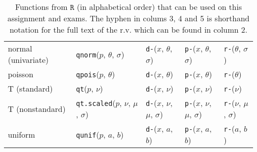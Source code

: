 \begin{table}[htp]
\begin{tabular}{l | llll}
    normal (univariate) & \texttt{qnorm}($p$, $\theta$, $\sigma$) 
    & \texttt{d-}($x$, $\theta$, $\sigma$)
    & \texttt{p-}($x$, $\theta$, $\sigma$) 
    & \texttt{r-}($\theta$, $\sigma$) \\
    
    
    poisson & \texttt{qpois}($p$, $\theta$) 
    & \texttt{d-}($x$, $\theta$)
    & \texttt{p-}($x$, $\theta$) 
    & \texttt{r-}($\theta$) \\
    
    T (standard) & \texttt{qt}($p$, $\nu$) 
    & \texttt{d-}($x$, $\nu$) 
    & \texttt{p-}($x$, $\nu$)
    & \texttt{r-}($\nu$) \\
    
    T (nonstandard) & \texttt{qt.scaled}($p$, $\nu$, $\mu$, $\sigma$) 
    & \texttt{d-}($x$, $\nu$, $\mu$, $\sigma$)
    & \texttt{p-}($x$, $\nu$, $\mu$, $\sigma$) 
    & \texttt{r-}($\nu$, $\mu$, $\sigma$) \\
    
    uniform & \texttt{qunif}($p$, $a$, $b$) 
    & \texttt{d-}($x$, $a$, $b$)
    & \texttt{p-}($x$, $a$, $b$) 
    & \texttt{r-}($a$, $b$) \\
    
    
    \end{tabular}
    \caption{Functions from $\texttt{R}$ (in alphabetical order) that can be used on this assignment and exams. The hyphen in colums 3, 4 and 5 is shorthand notation for the full text of the r.v. which can be found in column 2.
    }
    \label{tab:eqs}
    \end{table}